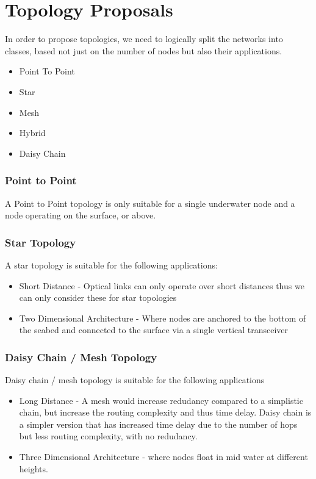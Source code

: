 \section{Topology Proposals}
In order to propose topologies, we need to logically split the networks into
classes, based not just on the number of nodes but also their applications.

\begin{itemize}
\item{Point To Point}
\item{Star}
\item{Mesh}
\item{Hybrid}
\item{Daisy Chain}
\end{itemize}

\subsubsection{Point to Point}
A Point to Point topology is only suitable for a single underwater node and a
node operating on the surface, or above.

\subsubsection{Star Topology}
A star topology is suitable for the following applications:
\begin{itemize}
\item{Short Distance - Optical links can only operate over short distances thus
we can only consider these for star topologies}
\item{Two Dimensional Architecture \cite{POMPILI2009778} - Where nodes are
anchored to the bottom of the seabed and connected to the surface via a single
vertical transceiver}
\end{itemize}

\subsubsection{Daisy Chain / Mesh Topology}
Daisy chain / mesh topology is suitable for the following applications
\begin{itemize}
\item{Long Distance - A mesh would increase redudancy compared to a simplistic
chain, but increase the routing complexity and thus time delay. Daisy chain is
a simpler version that has increased time delay due to the number of hops
but less routing complexity, with no redudancy.}
\item{Three Dimensional Architecture \cite{POMPILI2009778} - where nodes float
in mid water at different heights.}
\end{itemize}

